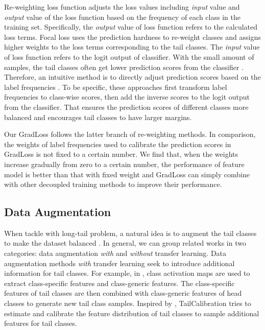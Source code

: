 \documentclass[runningheads]{llncs}
\begin{document}
Re-weighting loss function adjusts the loss values including \textit{input} value and \textit{output} value of the loss function based on the frequency of each class in the training set. Specifically, the \textit{output} value of loss function refers to the calculated loss terms. Focal loss \cite{lin2017focal} uses the prediction hardness to re-weight classes and assigns higher weights to the loss terms corresponding to the tail classes. The \textit{input} value of loss function refers to the logit output of classifier. With the small amount of samples, the tail classes often get lower prediction scores from the classifier \cite{wu2020distribution}. Therefore, an intuitive method is to directly adjust prediction scores based on the label frequencies \cite{cao2019learning,ren2020balanced,menon2020long}. To be specific, these approaches first transform label frequencies to class-wise scores, then add the inverse scores to the logit output from the classifier. That ensures the prediction scores of different classes more balanced and encourages tail classes to have larger margins. 

Our GradLoss follows the latter branch of re-weighting methods. In comparison, the weights of label frequencies used to calibrate the prediction scores in GradLoss is not fixed to a certain number. We find that, when the weights increase gradually from zero to a certain number, the performance of feature model is better than that with fixed weight and GradLoss can simply combine with other decoupled training methods to improve their performance.

\subsection{Data Augmentation}
When tackle with long-tail problem, a natural idea is to augment the tail classes to make the dataset balanced \cite{zang2021fasa,yin2019feature,kim2020m2m,liu2020deep,chu2020feature,wang2021rsg,Li_2021_CVPR,li2021self,vigneswaran2021feature}. In general, we can group related works in two categories: data augmentation \textit{with} and \textit{without} transfer learning. Data augmentation methods \textit{with} transfer learning \cite{li2021self,wang2021rsg,chu2020feature,kim2020m2m,yin2019feature,wang2021label} seek to introduce additional information for tail classes. For example, in \cite{chu2020feature}, class activation maps are used to extract class-specific features and class-generic features. The class-specific features of tail classes are then combined with class-generic features of head classes to generate new tail class samples. Inspired by \cite{yang2021free}, TailCalibration \cite{vigneswaran2021feature} tries to estimate and calibrate the feature distribution of tail classes to sample additional features for tail classes.  
\end{document}
